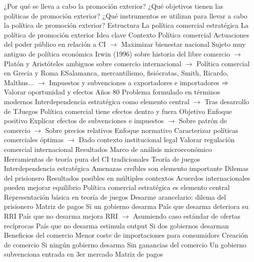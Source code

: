 \documentclass{nuevotema}
\begin{document}
\begin{esquemal}
			\3 ¿Por qué se lleva a cabo la promoción exterior?
			\3 ¿Qué objetivos tienen las políticas de promoción exterior?
			\3 ¿Qué instrumentos se utilizan para llevar a cabo la política de promoción exterior?
		\2 Estructura
			\3 La política comercial estratégica
			\3 La política de promoción exterior
	\1 
		\2 Idea clave
			\3 Contexto
				\4 Política comercial
				\4[] Actuaciones del poder público en relación a CI
				\4[] $\to$ Maximizar bienestar nacional
				\4 Sujeto muy antiguo de política económica
				\4[] Irwin (1996) sobre historia del libre comercio
				\4[] $\to$ Platón y Aristóteles ambiguos sobre comercio internacional
				\4[] $\to$ Política comercial  en Grecia y Roma
				\4[] ESalamanca, mercantilismo, fisiócratas, Smith, Ricardo, Malthus...
				\4[] $\to$ Impuestos y subvenciones a exportadores e importadores
				\4[] $\Rightarrow$ Valorar oportunidad y efectos
				\4 Años 80
				\4[] Problema formulado en términos modernos
				\4[] Interdependencia estratégica como elemento central
				\4[] $\to$ Tras desarrollo de TJuegos
				\4[] Política comercial tiene efectos dentro y fuera
			\3 Objetivo
				\4 Enfoque positivo
				\4[] Explicar efectos de subvenciones e impuestos
				\4[] $\to$ Sobre patrón de comercio
				\4[] $\to$ Sobre precios relativos
				\4 Enfoque normativo
				\4[] Caracterizar políticas comerciales óptimas
				\4[] $\to$ Dado contexto institucional legal
				\4[] Valorar regulación comercial internacional
			\3 Resultados
				\4 Marco de análisis microeconómico
				\4[] Herramientas de teoría pura del CI tradicionales
				\4[] Teoría de juegos
				\4[] Interdependencia estratégica
				\4[] Amenazas creíbles son elemento importante
				\4 Dilemas del prisionero
				\4[] Resultados posibles en múltiples contextos
				\4 Acuerdos internacionales pueden mejorar equilibrio
				\4[] Política comercial estratégica es elemento central
		\2 Representación básica en teoría de juegos
			\3 Desarme arancelario: dilema del prisionero
				\4 Matriz de pagos
				\4 
				\4 Si un gobierno desarma
				\4[] País que desarma deteriora su RRI
				\4[] País que no desarma mejora RRI
				\4[] $\to$ Asumiendo caso estándar de ofertas recíprocas
				\4[] País que no desarma estimula output
				\4 Si dos gobiernos desarman
				\4[] Beneficios del comercio
				\4[] Menor coste de importaciones para consumidors
				\4[] Creación de comercio
				\4 Si ningún gobierno desarma
				\4[] Sin ganancias del comercio
			\3 Un gobierno subvenciona entrada en 3er mercado
				\4 Matriz de pagos

\end{esquemal}
\end{document}
